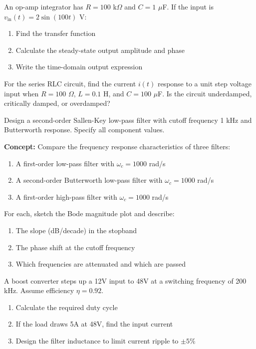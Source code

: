 \begin{exercise}
An op-amp integrator has $R = 100$ k$\Omega$ and $C = 1$ $\mu$F. If the input is $v_{\text{in}}(t) = 2\sin(100t)$ V:
\begin{enumerate}[label=(\alph*)]
    \item Find the transfer function
    \item Calculate the steady-state output amplitude and phase
    \item Write the time-domain output expression
\end{enumerate}
\end{exercise}

\begin{exercise}
For the series RLC circuit, find the current $i(t)$ response to a unit step voltage input when $R = 100$ $\Omega$, $L = 0.1$ H, and $C = 100$ $\mu$F. Is the circuit underdamped, critically damped, or overdamped?
\end{exercise}

\begin{exercise}
Design a second-order Sallen-Key low-pass filter with cutoff frequency 1 kHz and Butterworth response. Specify all component values.
\end{exercise}

\begin{exercise}
\textbf{Concept:} Compare the frequency response characteristics of three filters:
\begin{enumerate}[label=(\alph*)]
    \item A first-order low-pass filter with $\omega_c = 1000$ rad/s
    \item A second-order Butterworth low-pass filter with $\omega_c = 1000$ rad/s
    \item A first-order high-pass filter with $\omega_c = 1000$ rad/s
\end{enumerate}

For each, sketch the Bode magnitude plot and describe:
\begin{enumerate}[label=(\alph*)]
    \item The slope (dB/decade) in the stopband
    \item The phase shift at the cutoff frequency
    \item Which frequencies are attenuated and which are passed
\end{enumerate}
\end{exercise}

\begin{exercise}
A boost converter steps up a 12V input to 48V at a switching frequency of 200 kHz. Assume efficiency $\eta = 0.92$.

\begin{enumerate}[label=(\alph*)]
    \item Calculate the required duty cycle
    \item If the load draws 5A at 48V, find the input current
    \item Design the filter inductance to limit current ripple to $\pm 5\%$
\end{enumerate}
\end{exercise}

